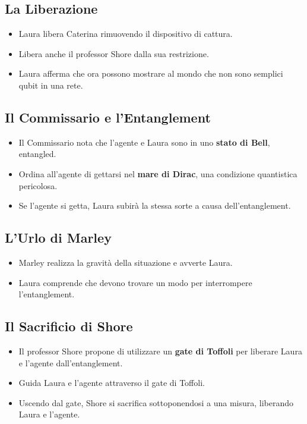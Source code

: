 \subsection*{La Liberazione}

\begin{itemize}
    \item Laura libera Caterina rimuovendo il dispositivo di cattura.
    \item Libera anche il professor Shore dalla sua restrizione.
    \item Laura afferma che ora possono mostrare al mondo che non sono semplici qubit in una rete.
\end{itemize}

\subsection*{Il Commissario e l'Entanglement}

\begin{itemize}
    \item Il Commissario nota che l'agente e Laura sono in uno \textbf{stato di Bell}, entangled.
    \item Ordina all'agente di gettarsi nel \textbf{mare di Dirac}, una condizione quantistica pericolosa.
    \item Se l'agente si getta, Laura subirà la stessa sorte a causa dell'entanglement.
\end{itemize}

\subsection*{L'Urlo di Marley}

\begin{itemize}
    \item Marley realizza la gravità della situazione e avverte Laura.
    \item Laura comprende che devono trovare un modo per interrompere l'entanglement.
\end{itemize}

\subsection*{Il Sacrificio di Shore}

\begin{itemize}
    \item Il professor Shore propone di utilizzare un \textbf{gate di Toffoli} per liberare Laura e l'agente dall'entanglement.
    \item Guida Laura e l'agente attraverso il gate di Toffoli.
    \item Uscendo dal gate, Shore si sacrifica sottoponendosi a una misura, liberando Laura e l'agente.
\end{itemize}

